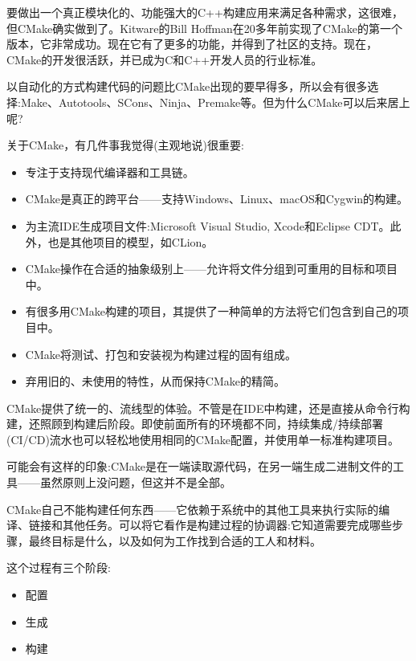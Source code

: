 要做出一个真正模块化的、功能强大的C++构建应用来满足各种需求，这很难，但CMake确实做到了。Kitware的Bill Hoffman在20多年前实现了CMake的第一个版本，它非常成功。现在它有了更多的功能，并得到了社区的支持。现在，CMake的开发很活跃，并已成为C和C++开发人员的行业标准。

以自动化的方式构建代码的问题比CMake出现的要早得多，所以会有很多选择:Make、Autotools、SCons、Ninja、Premake等。但为什么CMake可以后来居上呢?

关于CMake，有几件事我觉得(主观地说)很重要:

\begin{itemize}
\item 
专注于支持现代编译器和工具链。

\item 
CMake是真正的跨平台——支持Windows、Linux、macOS和Cygwin的构建。

\item 
为主流IDE生成项目文件:Microsoft Visual Studio, Xcode和Eclipse CDT。此外，也是其他项目的模型，如CLion。

\item 
CMake操作在合适的抽象级别上——允许将文件分组到可重用的目标和项目中。

\item 
有很多用CMake构建的项目，其提供了一种简单的方法将它们包含到自己的项目中。

\item 
CMake将测试、打包和安装视为构建过程的固有组成。

\item 
弃用旧的、未使用的特性，从而保持CMake的精简。
\end{itemize}

CMake提供了统一的、流线型的体验。不管是在IDE中构建，还是直接从命令行构建，还照顾到构建后阶段。即使前面所有的环境都不同，持续集成/持续部署(CI/CD)流水也可以轻松地使用相同的CMake配置，并使用单一标准构建项目。


可能会有这样的印象:CMake是在一端读取源代码，在另一端生成二进制文件的工具——虽然原则上没问题，但这并不是全部。

CMake自己不能构建任何东西——它依赖于系统中的其他工具来执行实际的编译、链接和其他任务。可以将它看作是构建过程的协调器:它知道需要完成哪些步骤，最终目标是什么，以及如何为工作找到合适的工人和材料。

这个过程有三个阶段:

\begin{itemize}
\item 
配置

\item 
生成

\item 
构建
\end{itemize}

